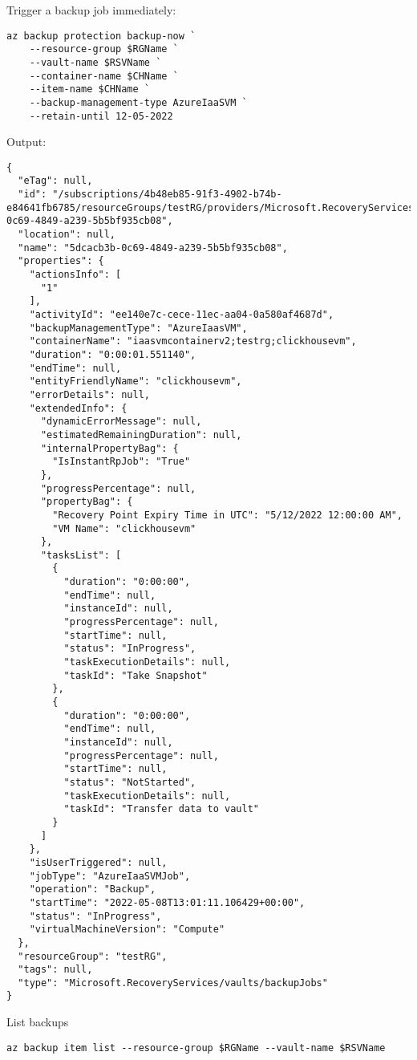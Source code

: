 Trigger a backup job immediately:
\begin{verbatim}
az backup protection backup-now `
    --resource-group $RGName `
    --vault-name $RSVName `
    --container-name $CHName `
    --item-name $CHName `
    --backup-management-type AzureIaaSVM `
    --retain-until 12-05-2022
\end{verbatim}

Output:
\begin{verbatim}
{
  "eTag": null,
  "id": "/subscriptions/4b48eb85-91f3-4902-b74b-e84641fb6785/resourceGroups/testRG/providers/Microsoft.RecoveryServices/vaults/myRSV/backupJobs/5dcacb3b-0c69-4849-a239-5b5bf935cb08",
  "location": null,
  "name": "5dcacb3b-0c69-4849-a239-5b5bf935cb08",
  "properties": {
    "actionsInfo": [
      "1"
    ],
    "activityId": "ee140e7c-cece-11ec-aa04-0a580af4687d",
    "backupManagementType": "AzureIaasVM",
    "containerName": "iaasvmcontainerv2;testrg;clickhousevm",
    "duration": "0:00:01.551140",
    "endTime": null,
    "entityFriendlyName": "clickhousevm",
    "errorDetails": null,
    "extendedInfo": {
      "dynamicErrorMessage": null,
      "estimatedRemainingDuration": null,
      "internalPropertyBag": {
        "IsInstantRpJob": "True"
      },
      "progressPercentage": null,
      "propertyBag": {
        "Recovery Point Expiry Time in UTC": "5/12/2022 12:00:00 AM",
        "VM Name": "clickhousevm"
      },
      "tasksList": [
        {
          "duration": "0:00:00",
          "endTime": null,
          "instanceId": null,
          "progressPercentage": null,
          "startTime": null,
          "status": "InProgress",
          "taskExecutionDetails": null,
          "taskId": "Take Snapshot"
        },
        {
          "duration": "0:00:00",
          "endTime": null,
          "instanceId": null,
          "progressPercentage": null,
          "startTime": null,
          "status": "NotStarted",
          "taskExecutionDetails": null,
          "taskId": "Transfer data to vault"
        }
      ]
    },
    "isUserTriggered": null,
    "jobType": "AzureIaaSVMJob",
    "operation": "Backup",
    "startTime": "2022-05-08T13:01:11.106429+00:00",
    "status": "InProgress",
    "virtualMachineVersion": "Compute"
  },
  "resourceGroup": "testRG",
  "tags": null,
  "type": "Microsoft.RecoveryServices/vaults/backupJobs"
}
\end{verbatim}

List backups
\begin{verbatim}
az backup item list --resource-group $RGName --vault-name $RSVName
\end{verbatim}


